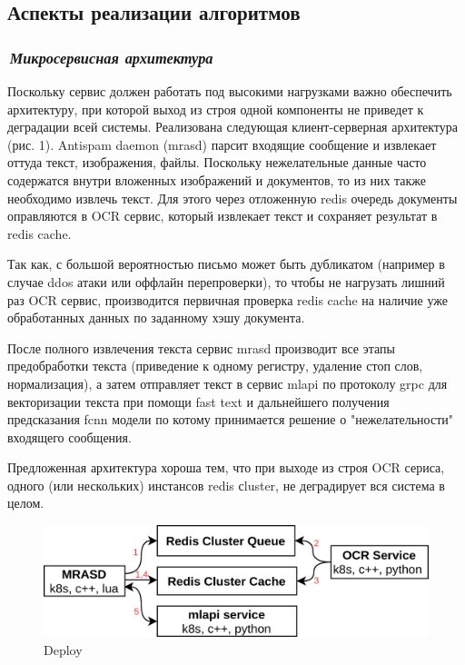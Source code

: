 \documentclass[12pt]{article}
\begin{document}
\subsection{Аспекты реализации алгоритмов}

\subsubsection*{\it\,Микросервисная архитектура}

Поскольку сервис должен работать под высокими нагрузками важно обеспечить архитектуру, при которой выход из строя одной компоненты не приведет к деградации всей системы. Реализована следующая клиент-серверная архитектура (рис. 1). Antispam daemon (mrasd) парсит входящие сообщение и извлекает оттуда текст, изображения, файлы.  Поскольку нежелательные данные часто содержатся внутри вложенных изображений и документов, то из них также необходимо извлечь текст. Для этого через отложенную redis очередь документы оправляются в OCR сервис, который извлекает текст и сохраняет результат в redis cache.

Так как, с большой вероятностью письмо может быть дубликатом (например в случае ddos атаки или оффлайн перепроверки), то чтобы не нагрузать лишний раз OCR сервис, производится первичная проверка redis cache на наличие уже обработанных данных по заданному хэшу документа.

После полного извлечения текста сервис mrasd производит все этапы предобработки текста (приведение к одному регистру, удаление стоп слов, нормализация), а затем отправляет текст в сервис mlapi по протоколу grpc для векторизации текста при помощи fast text и дальнейшего получения предсказания fcnn модели по котому принимается решение о "нежелательности"  входящего сообщения.

Предложенная архитектура хороша тем, что при выходе из строя OCR сериса, одного (или нескольких) инстансов redis сluster, не деградирует вся система в целом.
 
\begin{figure}[h!]
	\center
	\includegraphics[scale=0.25]{deploy.jpg}
	\caption{Deploy}
	\label{fig:02}
\end{figure}
\end{document}
